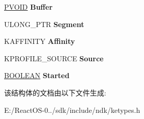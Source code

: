 \begin{DoxyCompactItemize}
\hyperlink{interfacevoid}{P\+V\+O\+ID} {\bfseries Buffer}
\item 
\mbox{\label{struct___k_p_r_o_f_i_l_e_a6e89b882d2da948f6ca56bb2069ab4cd}} 
U\+L\+O\+N\+G\+\_\+\+P\+TR {\bfseries Segment}
\item 
\mbox{\label{struct___k_p_r_o_f_i_l_e_ab0f2354b13b0f368043bb118d891514c}} 
K\+A\+F\+F\+I\+N\+I\+TY {\bfseries Affinity}
\item 
\mbox{\label{struct___k_p_r_o_f_i_l_e_a26a15045c1f36a7856a7b469de6722e3}} 
K\+P\+R\+O\+F\+I\+L\+E\+\_\+\+S\+O\+U\+R\+CE {\bfseries Source}
\item 
\mbox{\label{struct___k_p_r_o_f_i_l_e_a55df9b494009b3481dfb803bf4dddac9}} 
\hyperlink{_processor_bind_8h_a112e3146cb38b6ee95e64d85842e380a}{B\+O\+O\+L\+E\+AN} {\bfseries Started}
\end{DoxyCompactItemize}


该结构体的文档由以下文件生成\+:\begin{DoxyCompactItemize}
\item 
E\+:/\+React\+O\+S-\/0../sdk/include/ndk/ketypes.\+h\end{DoxyCompactItemize}
